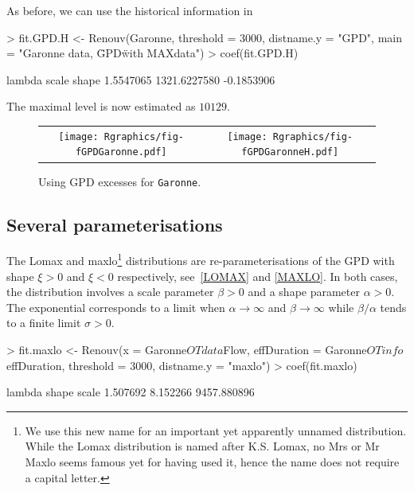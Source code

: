 \documentclass[a4paper]{report}
\begin{document}
As before, we can use the historical information in \verb@Garonne@

\begin{Schunk}
\begin{Sinput}
> fit.GPD.H <- Renouv(Garonne, threshold = 3000, distname.y = "GPD",
                      main = "Garonne data, \"GPD\" with MAXdata")
> coef(fit.GPD.H)
\end{Sinput}
\begin{Soutput}
      lambda        scale        shape 
   1.5547065 1321.6227580   -0.1853906 
\end{Soutput}
\end{Schunk}
The maximal level is now estimated
as  $10129$. 

\begin{figure}
   \centering
   \begin{tabular}{c c} 
     \texttt{[image: Rgraphics/fig-fGPDGaronne.pdf]} &
     \texttt{[image: Rgraphics/fig-fGPDGaronneH.pdf]} 
   \end{tabular}
   \caption{
     \label{FIGGPD} Using GPD excesses for \texttt{Garonne}.
   }
\end{figure}

\subsection{Several parameterisations}
The Lomax and maxlo\footnote{We use this new name for
  an important yet apparently unnamed distribution. While 
  the Lomax distribution is named after K.S. Lomax, no
  Mrs or Mr Maxlo seems famous yet for having used it, hence the name does not require
  a capital letter.
}
distributions are re-parameterisations of the GPD with shape $\xi > 0$ and
$\xi <0$ respectively, see~\ref{LOMAX} and \ref{MAXLO}. In both cases,
the distribution involves a scale parameter $\beta>0$ and a shape
parameter $\alpha>0$. The exponential corresponds to a limit when $\alpha
\to \infty$ and $\beta \to \infty$ while $\beta / \alpha$ tends to a
finite limit $\sigma>0$.

\begin{Schunk}
\begin{Sinput}
> fit.maxlo <- Renouv(x = Garonne$OTdata$Flow,
                      effDuration = Garonne$OTinfo$effDuration, 
                      threshold = 3000, distname.y = "maxlo")
> coef(fit.maxlo)
\end{Sinput}
\begin{Soutput}
     lambda       shape       scale 
   1.507692    8.152266 9457.880896 
\end{Soutput}
\end{Schunk}
\end{document}
